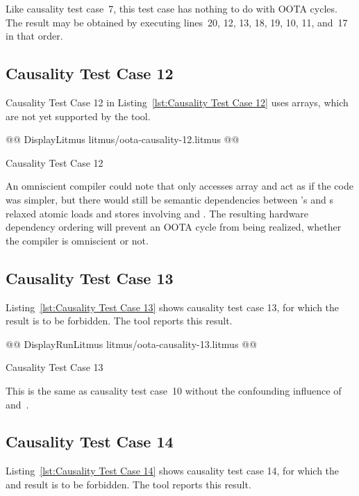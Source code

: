 \documentclass[10]{article}
\begin{document}
Like causality test case~7, this test case has nothing to do with OOTA cycles.
The result may be obtained by executing lines~20, 12, 13, 18, 19, 10, 11,
and~17 in that order.

\subsection{Causality Test Case 12}
\label{app:Causality Test Case 12}

Causality Test Case 12 in
Listing~\ref{lst:Causality Test Case 12}
uses arrays, which are not yet supported by the  tool.

\begin{listing}[tbp]
@@ DisplayLitmus litmus/oota-causality-12.litmus @@
\caption{Causality Test Case 12}
\label{lst:Causality Test Case 12}
\end{listing}

An omniscient compiler could note that only  accesses
array  and act as if the code was simpler, but there would
still be semantic dependencies between 's and s
relaxed atomic loads and stores involving  and .
The resulting hardware dependency ordering will prevent an OOTA cycle
from being realized, whether the compiler is omniscient or not.

\subsection{Causality Test Case 13}
\label{app:Causality Test Case 13}

Listing~\ref{lst:Causality Test Case 13}
shows causality test case 13, for which the 
result is to be forbidden.
The  tool reports this result.

\begin{listing}[tbp]
@@ DisplayRunLitmus litmus/oota-causality-13.litmus @@
\caption{Causality Test Case 13}
\label{lst:Causality Test Case 13}
\end{listing}

This is the same as causality test case~10 without the confounding
influence of  and~.

\subsection{Causality Test Case 14}
\label{app:Causality Test Case 14}

Listing~\ref{lst:Causality Test Case 14}
shows causality test case 14, for which the  and 
result is to be forbidden.
The  tool reports this result.
\end{document}
